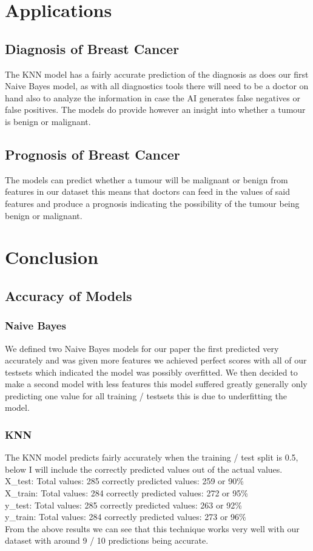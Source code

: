 \documentclass[conference]{IEEEtran}
\begin{document}
\section{Applications}
\subsection{Diagnosis of Breast Cancer}
The KNN model has a fairly accurate prediction of the diagnosis as does our first Naive Bayes model, as with all diagnostics tools there will need to be a doctor on hand also to analyze the information in case the AI generates false negatives or false positives.  The models do provide however an insight into whether a tumour is benign or malignant.
\subsection{Prognosis of Breast Cancer}
The models can predict whether a tumour will be malignant or benign from features in our dataset this means that doctors can feed in the values of said features and produce a prognosis indicating the possibility of the tumour being benign or malignant.
\section{Conclusion}
\subsection{Accuracy of Models}
\subsubsection{Naive Bayes}
We defined two Naive Bayes models for our paper the first predicted very accurately and was given more features we achieved perfect scores with all of our testsets which indicated the model was possibly overfitted.  We then decided to make a second model with less features this model suffered greatly generally only predicting one value for all training / testsets this is due to underfitting the model.
\subsubsection{KNN}
The KNN model predicts fairly accurately when the training / test split is 0.5, below I will include the correctly predicted values out of the actual values.
\\
X\_test: Total values:  285  correctly predicted values:  259 or 90\%
\\
X\_train:  Total values:  284  correctly predicted values:  272 or 95\%
\\
y\_test: Total values:  285  correctly predicted values:  263 or 92\%
\\
y\_train: Total values:  284  correctly predicted values:  273 or 96\%
\\
From the above results we can see that this technique works very well with our dataset with around 9 / 10 predictions being accurate. 
\end{document}
